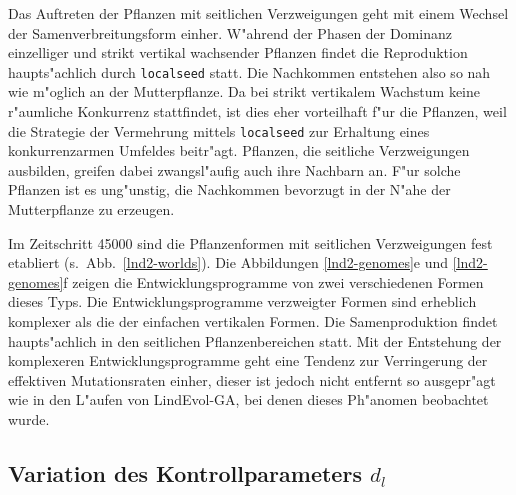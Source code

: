Das Auftreten der Pflanzen mit seitlichen Verzweigungen geht mit einem Wechsel der Samenverbreitungsform einher.
W"ahrend der Phasen der Dominanz einzelliger und strikt vertikal wachsender Pflanzen findet die Reproduktion haupts"achlich
durch \verb|localseed| statt. Die Nachkommen entstehen also so nah wie m"oglich an der Mutterpflanze. Da bei strikt
vertikalem Wachstum keine r"aumliche Konkurrenz stattfindet, ist dies eher vorteilhaft f"ur die Pflanzen, weil die Strategie
der Vermehrung mittels \verb|localseed| zur Erhaltung eines konkurrenzarmen Umfeldes beitr"agt. Pflanzen, die seitliche
Verzweigungen ausbilden, greifen dabei zwangsl"aufig auch ihre Nachbarn an. F"ur solche Pflanzen ist es ung"unstig, die
Nachkommen bevorzugt in der N"ahe der Mutterpflanze zu erzeugen.

Im Zeitschritt 45000 sind die Pflanzenformen mit seitlichen Verzweigungen fest etabliert (s.\ Abb.\ \ref{lnd2-worlds}).
Die Abbildungen \ref{lnd2-genomes}e und \ref{lnd2-genomes}f zeigen die Entwicklungsprogramme von zwei verschiedenen
Formen dieses Typs. Die Entwicklungsprogramme verzweigter Formen sind erheblich komplexer als die der einfachen vertikalen
Formen. Die Samenproduktion findet haupts"achlich in den seitlichen Pflanzenbereichen statt. Mit der Entstehung der
komplexeren Entwicklungsprogramme geht eine Tendenz zur Verringerung der effektiven Mutationsraten einher,
dieser ist jedoch nicht entfernt so ausgepr"agt wie in den L"aufen von LindEvol-GA,
bei denen dieses Ph"anomen beobachtet wurde.


\subsection{Variation des Kontrollparameters $d_l$}
\label{leanover-discussion}

